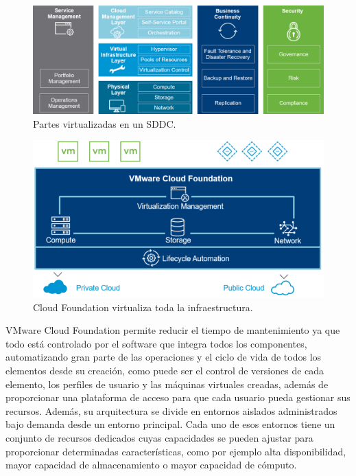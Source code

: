 \begin{figure}[h!]
  \centering
  \includegraphics[width=1\textwidth]{imaxes/cap2recursos/SDDCoverview.png}
  \caption{Partes virtualizadas en un SDDC.}
  \label{fig:sddcoverview}
\end{figure}

\begin{figure}[h!]
  \centering
  \includegraphics[width=1\textwidth]{imaxes/cap2recursos/overviewCF.png}
  \caption{Cloud Foundation virtualiza toda la infraestructura.}
  \label{fig:infraCloudFound}
\end{figure}
\FloatBarrier

VMware Cloud Foundation permite reducir el tiempo de mantenimiento ya que todo está controlado por el software que integra todos los componentes, automatizando gran parte de las operaciones y el ciclo de vida de todos los elementos desde su creación, como puede ser el control de versiones de cada elemento, los perfiles de usuario y las máquinas virtuales creadas, además de proporcionar una plataforma de acceso para que cada usuario pueda gestionar sus recursos. Además, su arquitectura se divide en entornos aislados administrados bajo demanda desde un entorno principal. Cada uno de esos entornos tiene un conjunto de recursos dedicados cuyas capacidades se pueden ajustar para proporcionar determinadas características, como por ejemplo alta disponibilidad, mayor capacidad de almacenamiento o mayor capacidad de cómputo. 

